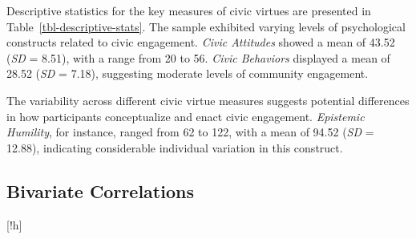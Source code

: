 \documentclass[
  man,
  floatsintext,
  longtable,
  nolmodern,
  notxfonts,
  notimes,
  colorlinks=true,linkcolor=blue,citecolor=blue,urlcolor=blue]{apa7}
\begin{document}
Descriptive statistics for the key measures of civic virtues are
presented in Table~\ref{tbl-descriptive-stats}. The sample exhibited
varying levels of psychological constructs related to civic engagement.
\emph{Civic Attitudes} showed a mean of 43.52 (\emph{SD} = 8.51), with a
range from 20 to 56. \emph{Civic Behaviors} displayed a mean of 28.52
(\emph{SD} = 7.18), suggesting moderate levels of community engagement.

The variability across different civic virtue measures suggests
potential differences in how participants conceptualize and enact civic
engagement. \emph{Epistemic Humility}, for instance, ranged from 62 to
122, with a mean of 94.52 (\emph{SD} = 12.88), indicating considerable
individual variation in this construct.

\subsection{Bivariate Correlations}\label{bivariate-correlations}

\begin{table}

{\caption{{Bivariate Correlations among Civic Virtues
Constructs}{\label{tbl-correlations}}}
\vspace{-20pt}}

[!h]
\centering
{}

\end{table}
\end{document}
